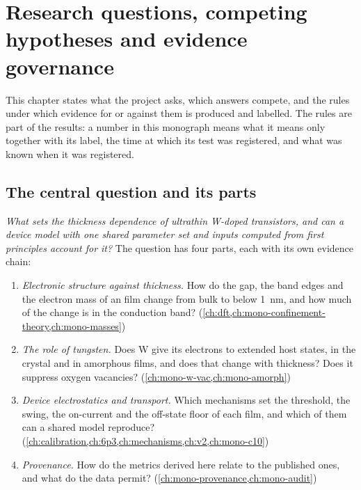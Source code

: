 \chapter{Research questions, competing hypotheses and evidence governance}
\label{ch:mono-questions}

This chapter states what the project asks, which answers compete, and the rules under which evidence for or against
them is produced and labelled. The rules are part of the results: a number in this monograph means what it means only
together with its label, the time at which its test was registered, and what was known when it was registered.

\section{The central question and its parts}
\label{sec:mono-q-central}

\emph{What sets the thickness dependence of ultrathin W-doped \InO{} transistors, and can a device model with one shared
parameter set and inputs computed from first principles account for it?} The question has four parts, each with its own
evidence chain:
\begin{enumerate}
\item \emph{Electronic structure against thickness.} How do the gap, the band edges and the electron mass of an \InO{}
film change from bulk to below 1~nm, and how much of the change is in the conduction band?
(\cref{ch:dft,ch:mono-confinement-theory,ch:mono-masses})
\item \emph{The role of tungsten.} Does W give its electrons to extended host states, in the crystal and in amorphous
films, and does that change with thickness? Does it suppress oxygen vacancies? (\cref{ch:mono-w-vac,ch:mono-amorph})
\item \emph{Device electrostatics and transport.} Which mechanisms set the threshold, the swing, the on-current and the
off-state floor of each film, and which of them can a shared model reproduce?
(\cref{ch:calibration,ch:6p3,ch:mechanisms,ch:v2,ch:mono-c10})
\item \emph{Provenance.} How do the metrics derived here relate to the published ones, and what do the data permit?
(\cref{ch:mono-provenance,ch:mono-audit})
\end{enumerate}

